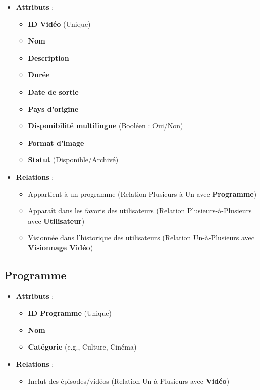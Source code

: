 \documentclass{article}
\begin{document}
\begin{itemize}
    \item \textbf{Attributs} :
    \begin{itemize}
        \item \textbf{ID Vidéo} (Unique)
        \item \textbf{Nom}
        \item \textbf{Description}
        \item \textbf{Durée}
        \item \textbf{Date de sortie}
        \item \textbf{Pays d'origine}
        \item \textbf{Disponibilité multilingue} (Booléen : Oui/Non)
        \item \textbf{Format d'image}
        \item \textbf{Statut} (Disponible/Archivé)
    \end{itemize}
    \item \textbf{Relations} :
    \begin{itemize}
        \item Appartient à un programme (Relation Plusieurs-à-Un avec \textbf{Programme})
        \item Apparaît dans les favoris des utilisateurs (Relation Plusieurs-à-Plusieurs avec \textbf{Utilisateur})
        \item Visionnée dans l'historique des utilisateurs (Relation Un-à-Plusieurs avec \textbf{Visionnage Vidéo})
    \end{itemize}
\end{itemize}

\subsection{Programme}

\begin{itemize}
    \item \textbf{Attributs} :
    \begin{itemize}
        \item \textbf{ID Programme} (Unique)
        \item \textbf{Nom}
        \item \textbf{Catégorie} (e.g., Culture, Cinéma)
    \end{itemize}
    \item \textbf{Relations} :
    \begin{itemize}
        \item Inclut des épisodes/vidéos (Relation Un-à-Plusieurs avec \textbf{Vidéo})
    \end{itemize}
\end{itemize}
\end{document}
